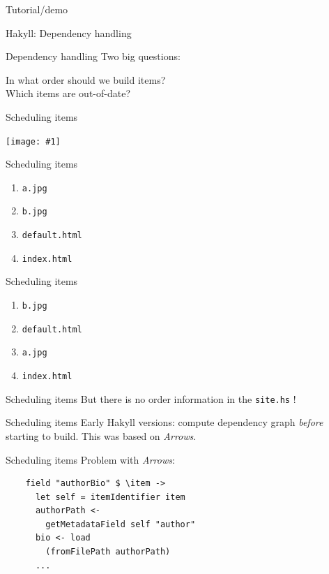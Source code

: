 \documentclass[20pt]{beamer}
\newcommand{\vspaced}{
    \vspace{5mm}
}
\newcommand{\imageframe}[1]{
    {
        \begin{frame}[plain]
        \begin{center}
        \texttt{[image: \#1]}
        \end{center}
        \end{frame}
    }
}
\newcommand{\chapterslide}[1]{
    {
        \begin{frame}[plain]
        \begin{center}
        \large{#1}
        \end{center}
        \end{frame}
    }
}
\newcommand{\code}[1]{
    \texttt{\small{#1}}
}
\begin{document}
\chapterslide{Tutorial/demo}

\chapterslide{Hakyll: Dependency handling}

\begin{frame}{Dependency handling}
    Two big questions: \\
    \vspaced
    In what order should we build items? \\
    Which items are out-of-date? \\
\end{frame}

\chapterslide{Scheduling items}

\imageframe{{images/deps-01.dot}.pdf}

\begin{frame}{Scheduling items}
    \begin{enumerate}
    \item \code{a.jpg}
    \item \code{b.jpg}
    \item \code{default.html}
    \item \code{index.html}
    \end{enumerate}
\end{frame}

\begin{frame}{Scheduling items}
    \begin{enumerate}
    \item \code{b.jpg}
    \item \code{default.html}
    \item \code{a.jpg}
    \item \code{index.html}
    \end{enumerate}
\end{frame}

\begin{frame}{Scheduling items}
    But there is no order information in the \code{site.hs}!
\end{frame}

\begin{frame}{Scheduling items}
    Early Hakyll versions: compute dependency graph \emph{before} starting to
    build.  This was based on \emph{Arrows}.
\end{frame}

\begin{frame}[fragile]{Scheduling items}
    Problem with \emph{Arrows}: \\
    \vspaced
    \begin{lstlisting}
    field "authorBio" $ \item ->
      let self = itemIdentifier item
      authorPath <-
        getMetadataField self "author"
      bio <- load
        (fromFilePath authorPath)
      ...
    \end{lstlisting}
\end{frame}
\end{document}
